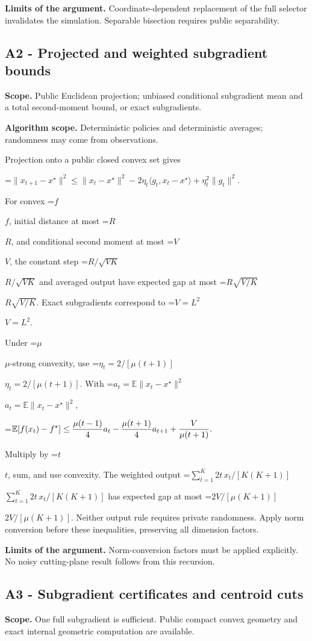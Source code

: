 \documentclass[10pt,a4paper]{article}
\newcommand{\AtlasMath}[1]{\par\begingroup\centering\setbox0=\hbox{$\displaystyle #1$}\ifdim\wd0>1.4\linewidth\typeout{ATLAS WIDE FORMULA: \the\wd0}\fi\ifdim\wd0>\linewidth\resizebox{\linewidth}{!}{\box0}\else\box0\fi\par\endgroup}
\newcommand{\AtlasInlineMath}[1]{\begingroup\setbox0=\hbox{$#1$}\ifdim\wd0>.4\linewidth\endgroup\AtlasMath{#1}\else\endgroup$#1$\fi}
\begin{document}
\textbf{Limits of the argument.} Coordinate-dependent replacement of the full selector invalidates the simulation. Separable bisection requires public separability.

\subsection{A2 - Projected and weighted subgradient bounds}
\textbf{Scope.} Public Euclidean projection; unbiased conditional subgradient mean and a total second-moment bound, or exact subgradients.

\textbf{Algorithm scope.} Deterministic policies and deterministic averages; randomness may come from observations.

Projection onto a public closed convex set gives

\AtlasMath{\|x_{t+1}-x^\star\|^2\le\|x_t-x^\star\|^2
-2\eta_t\langle g_t,x_t-x^\star\rangle+\eta_t^2\|g_t\|^2.}

For convex \AtlasInlineMath{f}, initial distance at most \AtlasInlineMath{R}, and conditional second moment at most \AtlasInlineMath{V}, the constant step \AtlasInlineMath{R/\sqrt{VK}} and averaged output have expected gap at most \AtlasInlineMath{R\sqrt{V/K}}. Exact subgradients correspond to \AtlasInlineMath{V=L^2}.

Under \AtlasInlineMath{\mu}-strong convexity, use \AtlasInlineMath{\eta_t=2/[\mu(t+1)]}. With \AtlasInlineMath{a_t=\mathbb E\|x_t-x^\star\|^2},

\AtlasMath{\mathbb E[f(x_t)-f^\star]\le{\mu(t-1)\over4}a_t
-{\mu(t+1)\over4}a_{t+1}+{V\over\mu(t+1)}.}

Multiply by \AtlasInlineMath{t}, sum, and use convexity. The weighted output
\AtlasInlineMath{\sum_{t=1}^K2t\,x_t/[K(K+1)]} has expected gap at most \AtlasInlineMath{2V/[\mu(K+1)]}. Neither output rule requires private randomness. Apply norm conversion before these inequalities, preserving all dimension factors.

\textbf{Limits of the argument.} Norm-conversion factors must be applied explicitly. No noisy cutting-plane result follows from this recursion.

\subsection{A3 - Subgradient certificates and centroid cuts}
\textbf{Scope.} One full subgradient is sufficient. Public compact convex geometry and exact internal geometric computation are available.
\end{document}
